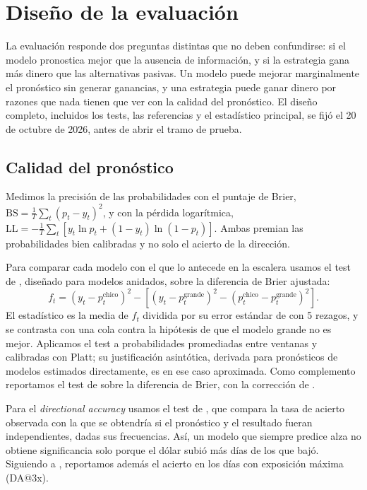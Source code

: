 \documentclass[11pt,a4paper]{article}
\begin{document}
\section{Diseño de la evaluación}\label{sec:evaluacion}

La evaluación responde dos preguntas distintas que no deben confundirse: si el modelo pronostica mejor que la ausencia de información, y si la estrategia gana más dinero que las alternativas pasivas. Un modelo puede mejorar marginalmente el pronóstico sin generar ganancias, y una estrategia puede ganar dinero por razones que nada tienen que ver con la calidad del pronóstico. El diseño completo, incluidos los tests, las referencias y el estadístico principal, se fijó el 20 de octubre de 2026, antes de abrir el tramo de prueba.

\subsection{Calidad del pronóstico}

Medimos la precisión de las probabilidades con el puntaje de Brier, \(\text{BS}=\tfrac1T\sum_t (p_t-y_t)^2\), y con la pérdida logarítmica, \(\text{LL}=-\tfrac1T\sum_t [y_t\ln p_t+(1-y_t)\ln(1-p_t)]\). Ambas premian las probabilidades bien calibradas y no solo el acierto de la dirección.

Para comparar cada modelo con el que lo antecede en la escalera usamos el test de \citet{clark2007}, diseñado para modelos anidados, sobre la diferencia de Brier ajustada:
\begin{equation}\label{eq:cw}
f_t=(y_t-p^{\text{chico}}_t)^2-\left[(y_t-p^{\text{grande}}_t)^2-(p^{\text{chico}}_t-p^{\text{grande}}_t)^2\right].
\end{equation}
El estadístico es la media de \(f_t\) dividida por su error estándar de \citet{newey1987} con 5 rezagos, y se contrasta con una cola contra la hipótesis de que el modelo grande no es mejor. Aplicamos el test a probabilidades promediadas entre ventanas y calibradas con Platt; su justificación asintótica, derivada para pronósticos de modelos estimados directamente, es en ese caso aproximada. Como complemento reportamos el test de \citet{diebold1995} sobre la diferencia de Brier, con la corrección de \citet{harvey1997}.

Para el \emph{directional accuracy} usamos el test de \citet{pesaran1992}, que compara la tasa de acierto observada con la que se obtendría si el pronóstico y el resultado fueran independientes, dadas sus frecuencias. Así, un modelo que siempre predice alza no obtiene significancia solo porque el dólar subió más días de los que bajó. Siguiendo a \citet{gonzalez2026}, reportamos además el acierto en los días con exposición máxima (DA@3x).
\end{document}
